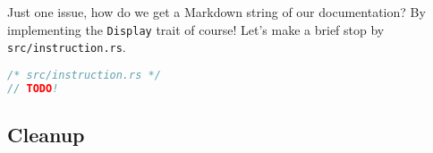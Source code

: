 Just one issue, how do we get a Markdown string of our documentation? By implementing the \texttt{Display} trait of course! Let's make a brief stop by \texttt{src/instruction.rs}.

\begin{lstlisting}[language=rust]
/* src/instruction.rs */
// TODO!
\end{lstlisting}

\subsection{Cleanup}







